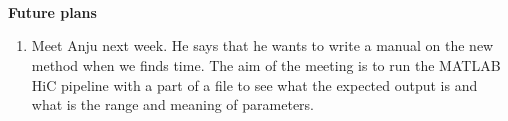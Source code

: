 \documentclass[idxtotoc,hyperref,openany]{labbook} %
\newcommand{\HRule}{\rule{\linewidth}{0.5mm}} %
\begin{document}
\begin{lstlisting}[language=bash]
	
\end{lstlisting}


\textbf{Future plans}

\begin{enumerate}
	\item Meet Anju next week. He says that he wants to write a manual
	on the new method when we finds time. The aim of the meeting is to run
	the MATLAB HiC pipeline with a part of a file to see what the expected output is and what is the range and meaning of parameters.
\end{enumerate}












\end{document}

